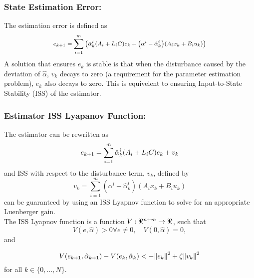 \documentclass[]{ieeetran}
\begin{document}
\subsubsection{State Estimation Error:}
The estimation error is defined as
\begin{equation} \label{eq:DE_state_error}
	\medmath{e_{k+1} = \sum_{i=1}^m \qty(\hat{\alpha}_k^i\qty(A_i + L_i C)e_k + \qty(\alpha^i - \hat{\alpha}_k^i)\qty(A_i x_k + B_i u_k))}
\end{equation}
A solution that ensures $e_k$ is stable is that when the disturbance caused by the deviation of $\hat{\alpha}$, $v_k$ decays to zero (a requirement for the parameter estimation problem), $e_k$ also decays to zero. This is equivelent to ensuring Input-to-State Stability (ISS) of the estimator.\\

\subsubsection{Estimator ISS Lyapanov Function:}
The estimator can be rewritten as
\begin{equation}\label{eq:DE_state_error_simple}
	e_{k+1} = \sum_{i=1}^m \hat{\alpha}_k^i \qty(A_i + L_i C) e_k + v_k
\end{equation}
and ISS with respect to the disturbance term, $v_k$, defined by
\begin{equation}
	v_k = \sum_{i=1}^m (\alpha^i - \hat{\alpha}_k^i) (A_i x_k + B_i u_k)
\end{equation}
can be guaranteed by using an ISS Lyapnov function to solve for an appropriate Luenberger gain.\\
The ISS Lyapnov function is a function $V : \real^{n+m} \to \real$, such that $$V(e,\hat{\alpha})>0 \forall e\neq 0, \quad V(0,\hat{\alpha}) = 0,$$ and

\begin{equation}
	V(e_{k+1}, \hat{\alpha}_{k+1}) - V(e_k, \hat{\alpha}_k) < -\norm{e_k}^2 + \zeta \norm{v_k}^2
\end{equation}
for all $k \in \{0, \dots,N\}$.

\end{document}
